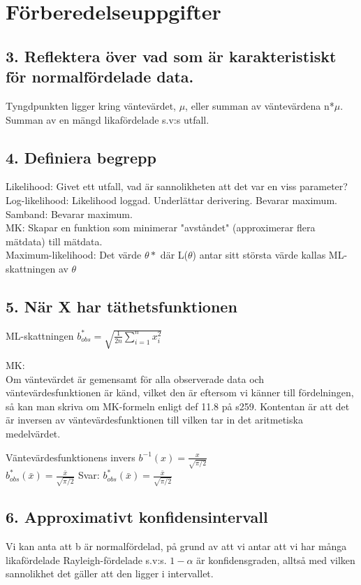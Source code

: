 \documentclass{article}
\begin{document}
\section*{Förberedelseuppgifter}

\subsection*{3. Reflektera över vad som är karakteristiskt för normalfördelade
data.}
Tyngdpunkten ligger kring väntevärdet, $\mu$, eller summan av väntevärdena
n*$\mu$.
Summan av en mängd likafördelade s.v:s utfall.

\subsection*{4. Definiera begrepp}
Likelihood: Givet ett utfall, vad är sannolikheten att det var en viss
parameter?\\
Log-likelihood: Likelihood loggad. Underlättar derivering. Bevarar maximum.\\
Samband: Bevarar maximum.\\
MK: Skapar en funktion som minimerar "avståndet" (approximerar flera mätdata)
till mätdata. \\
Maximum-likelihood: Det värde $\theta*$ där L($\theta$) antar sitt största värde
kallas ML-skattningen av $\theta$ \\

\subsection*{5. När X har täthetsfunktionen}
ML-skattningen $b_{obs}^* = \sqrt{\frac{1}{2n}\sum\limits_{i=1}^n x_i^2}$

MK:\\
Om väntevärdet är gemensamt för alla observerade data och väntevärdesfunktionen
är känd, vilket den är eftersom vi känner till fördelningen, så kan man skriva
om MK-formeln enligt def 11.8 på s259. Kontentan är att det är inversen av
väntevärdesfunktionen till vilken tar in det aritmetiska medelvärdet.

Väntevärdesfunktionens invers $b^{-1}(x) = \frac{x}{\sqrt{\pi/2}}$ \\
$b_{obs}^*(\bar{x}) = \frac{\bar{x}}{\sqrt{\pi/2}}$
Svar:  $b_{obs}^*(\bar{x}) = \frac{\bar{x}}{\sqrt{\pi/2}}$

\subsection*{6. Approximativt konfidensintervall}
Vi kan anta att b är normalfördelad, på grund av att vi antar att vi har många
likafördelade Rayleigh-fördelade s.v:s. $1 - \alpha$ är konfidensgraden, alltså
med vilken sannolikhet det gäller att den ligger i intervallet.
\end{document}
